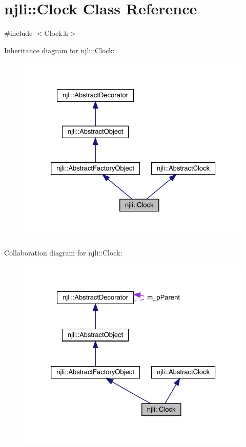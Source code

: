 \hypertarget{classnjli_1_1_clock}{}\section{njli\+:\+:Clock Class Reference}
\label{classnjli_1_1_clock}


{\ttfamily \#include $<$Clock.\+h$>$}



Inheritance diagram for njli\+:\+:Clock\+:\nopagebreak
\begin{figure}[H]
\begin{center}
\leavevmode
\includegraphics[width=326pt]{classnjli_1_1_clock__inherit__graph}
\end{center}
\end{figure}


Collaboration diagram for njli\+:\+:Clock\+:\nopagebreak
\begin{figure}[H]
\begin{center}
\leavevmode
\includegraphics[width=326pt]{classnjli_1_1_clock__coll__graph}
\end{center}
\end{figure}
